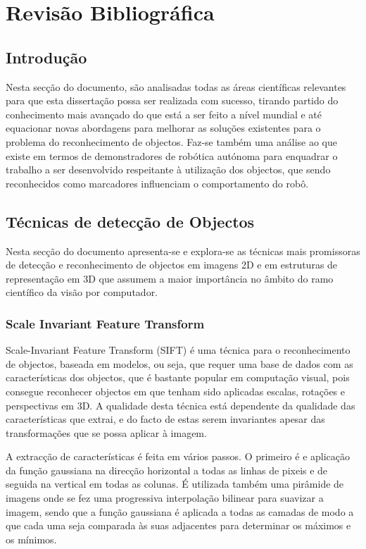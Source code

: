 \chapter{Revisão Bibliográfica} \label{chap:sota}

\section{Introdução}
Nesta secção do documento, são analisadas todas as áreas científicas relevantes
para que esta dissertação possa ser realizada com sucesso, tirando partido do
conhecimento mais avançado do que está a ser feito a nível mundial e até 
equacionar novas abordagens para melhorar as soluções existentes para o problema
do reconhecimento de objectos.
Faz-se também uma análise ao que existe em termos de demonstradores de robótica autónoma
para enquadrar o trabalho a ser desenvolvido respeitante à utilização dos objectos,
que sendo reconhecidos como marcadores influenciam o comportamento do robô.

\section{Técnicas de detecção de Objectos}\label{objdetect}

Nesta secção do documento apresenta-se e explora-se as técnicas mais
promissoras de detecção e reconhecimento de objectos em imagens 2D e
em estruturas de representação em 3D que assumem a maior importância 
no âmbito do ramo científico da visão por computador.

\subsection[SIFT]{Scale Invariant Feature Transform}

Scale-Invariant Feature Transform (SIFT) \cite{Lowe:1999:ORL:850924.851523} é uma técnica
para o reconhecimento de objectos, baseada em modelos, ou seja, que requer
uma base de dados com as características dos objectos, que é bastante 
popular em computação visual, pois consegue reconhecer objectos em 
que tenham sido aplicadas escalas, rotações e perspectivas em 3D. A qualidade
desta técnica está dependente da qualidade das características que extrai,
e do facto de estas serem invariantes apesar das transformações que se possa aplicar à imagem.

A extracção de características é feita em vários passos. O primeiro é e
aplicação da função gaussiana na direcção horizontal a todas as linhas de pixeis
 e de seguida na vertical em todas as colunas.
É utilizada também uma pirâmide de imagens onde se fez uma progressiva interpolação
bilinear para suavizar a imagem, sendo que  a função gaussiana é aplicada a
todas as camadas de modo a que cada uma seja comparada às suas adjacentes
para determinar os máximos e os mínimos.

